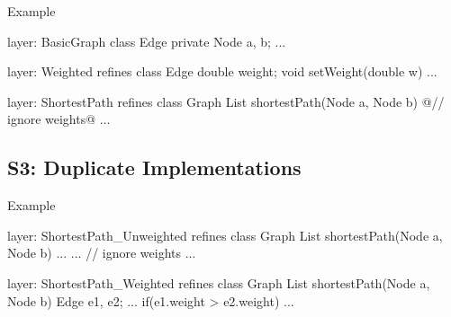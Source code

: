 \begin{frame}[fragile]{Example}
	\begin{mycolumns}[widths={50,50},animation=none]
		\vspace{3mm}
	\mynextcolumn
{\small
\begin{codetight}{layer: BasicGraph}
class Edge {
	private Node a, b;
	...
}
\end{codetight}	
\begin{codetight}{layer: Weighted}
refines class Edge {
	double weight;
	void setWeight(double w){ ... }
}
\end{codetight}	
\begin{codetight}{layer: ShortestPath}
refines class Graph {
	List shortestPath(Node a, Node b){
		@// ignore weights@
		... 
	}
}
\end{codetight}	
}
	\end{mycolumns}
\end{frame}

\subsection{S3: Duplicate Implementations}

\begin{frame}{\myframetitle}
\end{frame}

\begin{frame}[fragile]{Example}
	\begin{mycolumns}[widths={50,50},animation=none]
\begin{codetight}{layer: ShortestPath\_Unweighted}
refines class Graph {
	List shortestPath(Node a, Node b){
		...
		...
		// ignore weights
		... 
	}
}
\end{codetight}
	\mynextcolumn
\begin{codetight}{layer: ShortestPath\_Weighted}
refines class Graph {
	List shortestPath(Node a, Node b){
		Edge e1, e2;
		...
		if(e1.weight > e2.weight) 
		... 
	}
}
\end{codetight}	
	\end{mycolumns}
\end{frame}

